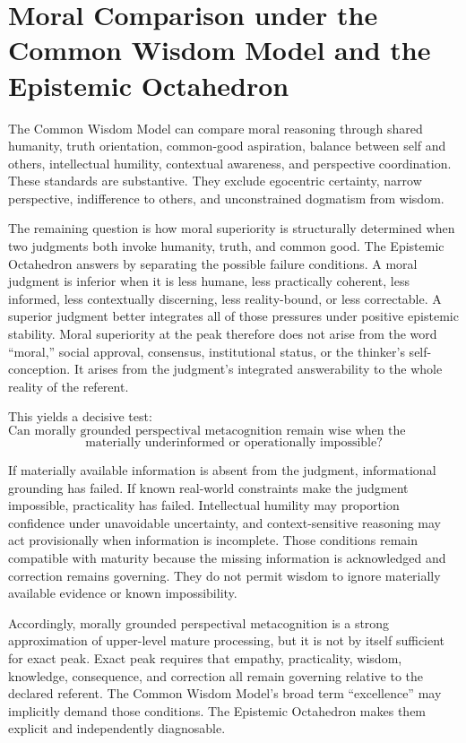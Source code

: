 \documentclass[11pt]{article}
\begin{document}
\section{Moral Comparison under the Common Wisdom Model and the Epistemic Octahedron}

The Common Wisdom Model can compare moral reasoning through shared humanity, truth orientation, common-good aspiration, balance between self and others, intellectual humility, contextual awareness, and perspective coordination. These standards are substantive. They exclude egocentric certainty, narrow perspective, indifference to others, and unconstrained dogmatism from wisdom.

The remaining question is how moral superiority is structurally determined when two judgments both invoke humanity, truth, and common good. The Epistemic Octahedron answers by separating the possible failure conditions. A moral judgment is inferior when it is less humane, less practically coherent, less informed, less contextually discerning, less reality-bound, or less correctable. A superior judgment better integrates all of those pressures under positive epistemic stability. Moral superiority at the peak therefore does not arise from the word ``moral,'' social approval, consensus, institutional status, or the thinker's self-conception. It arises from the judgment's integrated answerability to the whole reality of the referent.

This yields a decisive test:
\[
\text{Can morally grounded perspectival metacognition remain wise when the judgment is}
\]
\[
\text{materially underinformed or operationally impossible?}
\]

If materially available information is absent from the judgment, informational grounding has failed. If known real-world constraints make the judgment impossible, practicality has failed. Intellectual humility may proportion confidence under unavoidable uncertainty, and context-sensitive reasoning may act provisionally when information is incomplete. Those conditions remain compatible with maturity because the missing information is acknowledged and correction remains governing. They do not permit wisdom to ignore materially available evidence or known impossibility.

Accordingly, morally grounded perspectival metacognition is a strong approximation of upper-level mature processing, but it is not by itself sufficient for exact peak. Exact peak requires that empathy, practicality, wisdom, knowledge, consequence, and correction all remain governing relative to the declared referent. The Common Wisdom Model's broad term ``excellence'' may implicitly demand those conditions. The Epistemic Octahedron makes them explicit and independently diagnosable.
\end{document}
